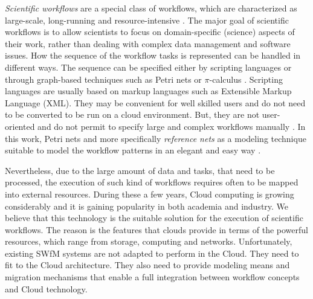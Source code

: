 %
%
\label{sec:introduction}
%
\emph{Scientific workflows} are a special class of workflows, which are characterized as large-scale, long-running and resource-intensive  \cite{scientific}. 
%
The major goal of scientific workflows is to allow scientists to focus on domain-specific (science) aspects of their work, rather than dealing with complex data management and software issues. 
%
How the sequence of the workflow tasks is represented can be handled in different ways.
%
The sequence can be specified either by scripting languages or through graph-based techniques such as Petri nets or $ \pi $-calculus \cite{Aalst03picalculus} \cite{smith04pi}.
%
Scripting languages are usually based on markup languages such as
Extensible Markup Language (XML). They may be convenient for well skilled users and do not need to be converted to be run on a cloud environment. But, they are not user-oriented and do not permit to  specify large and complex workflows manually \cite{hayatndt}. 
%
In this work, Petri nets and more specifically \textit{reference nets} \cite{Kummer02} as a modeling technique suitable to model the workflow patterns
in an elegant and easy way \cite{sofiane}.

Nevertheless, due to the large amount of data and tasks, that need to be processed, the execution of such kind of workflows requires often to be mapped into external resources.
%
During these a few years, Cloud computing is growing considerably and it is gaining popularity in both academia and industry.
%
We believe that this technology is the suitable solution for the execution of scientific workflows.
%
The reason is the  features that clouds  provide in terms of the powerful resources, which range from storage, computing and networks.
%
Unfortunately, existing SWfM systems are not adapted to perform in the Cloud.
%
They need to fit to the Cloud architecture.
%
They also need to provide modeling means and migration mechanisms that enable a full integration between workflow concepts and Cloud technology.


